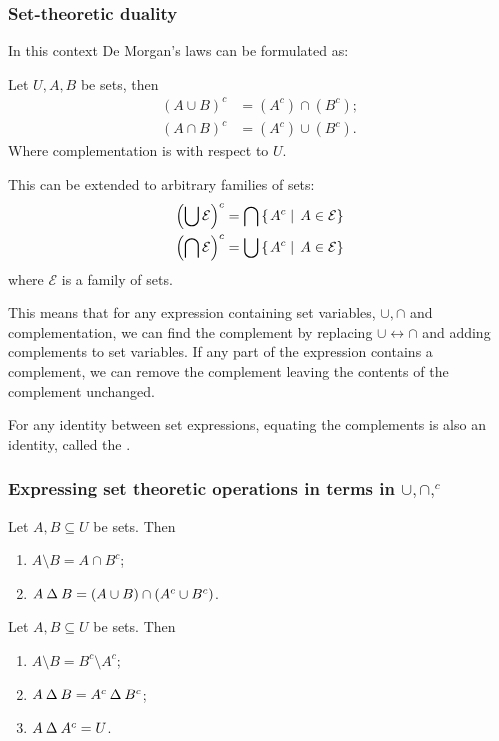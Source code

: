\subsubsection{Set-theoretic duality}
In this context De Morgan's laws can be formulated as:
\begin{proposition}
Let $U,A,B$ be sets, then
\begin{align*}
(A\cup B)^c &= (A^c)\cap (B^c); \\
(A\cap B)^c &= (A^c)\cup (B^c).
\end{align*}
Where complementation is with respect to $U$.

This can be extended to arbitrary families of sets:
\begin{align*}
\left(\bigcup \mathcal{E}\right)^c &= \bigcap\left\{\left. A^c \;\right|\; A\in\mathcal{E} \right\} \\
\left(\bigcap \mathcal{E}\right)^c &= \bigcup\left\{\left. A^c \;\right|\; A\in\mathcal{E} \right\}
\end{align*}
where $\mathcal{E}$ is a family of sets.
\end{proposition}
This means that for any expression containing set variables, $\cup, \cap$ and complementation, we can find the complement by replacing $\cup \leftrightarrow \cap$ and adding complements to set variables. If any part of the expression contains a complement, we can remove the complement leaving the contents of the complement unchanged.

For any identity between set expressions, equating the complements is also an identity, called the .

\subsubsection{Expressing set theoretic operations in terms in $\cup,\cap, ^c$}
\begin{proposition}
Let $A,B\subseteq U$ be sets. Then
\begin{enumerate}
\item $A\setminus B = A \cap B^c$;
\item $A\mathbin{\Delta} B = (A\cup B)\cap (A^c\cup B^c)$.
\end{enumerate}
\end{proposition}
\begin{corollary}
Let $A,B \subseteq U$ be sets. Then
\begin{enumerate}
\item $A\setminus B = B^c\setminus A^c$;
\item $A \mathbin{\Delta} B = A^c \mathbin{\Delta} B^c$;
\item $A \mathbin{\Delta} A^c = U$.
\end{enumerate}
\end{corollary}

